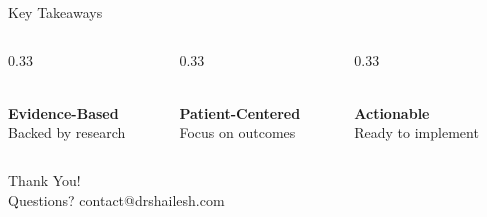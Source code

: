 \documentclass[aspectratio=169]{beamer}
\begin{document}
\begin{frame}{Key Takeaways}
    \begin{columns}[T]
        \begin{column}{0.33\textwidth}
            \begin{center}
                \textcolor{BrandPrimary}{\Large\faCheckCircle}\\[0.5cm]
                \textbf{Evidence-Based}\\
                \small Backed by research
            \end{center}
        \end{column}
        \begin{column}{0.33\textwidth}
            \begin{center}
                \textcolor{BrandSecondary}{\Large\faUsers}\\[0.5cm]
                \textbf{Patient-Centered}\\
                \small Focus on outcomes
            \end{center}
        \end{column}
        \begin{column}{0.33\textwidth}
            \begin{center}
                \textcolor{BrandAccent}{\Large\faRocket}\\[0.5cm]
                \textbf{Actionable}\\
                \small Ready to implement
            \end{center}
        \end{column}
    \end{columns}

    \vspace{1cm}

    \begin{center}
        \textcolor{BrandPrimary}{\Large Thank You!}\\[0.3cm]
        \small Questions? \textcolor{BrandSecondary}{contact@drshailesh.com}
    \end{center}
\end{frame}
\end{document}
